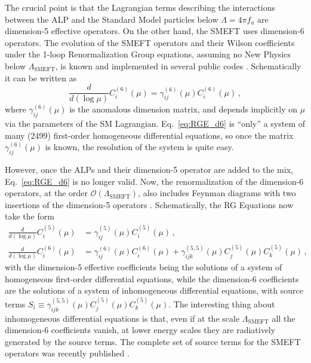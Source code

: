 \documentclass[combined.tex]{subfiles}
\begin{document}
The crucial point is that the Lagrangian terms describing the interactions between the ALP and the Standard Model particles below $\Lambda = 4\pi f_a$ are dimension-5 effective operators. On the other hand, the SMEFT uses dimension-6 operators. The evolution of the SMEFT operators and their Wilson coefficients under the 1-loop Renormalization Group equations, assuming no New Physics below $\Lambda_\mathrm{SMEFT}$, is known \cite{Jenkins:2013zja,Jenkins:2013wua,Alonso:2013hga,} and implemented in several public codes \cite{Celis:2017hod,Aebischer:2018bkb}. Schematically it can be written as
\begin{equation}
\frac{d}{d(\log \mu)}C^{(6)}_i(\mu) = \gamma^{(6)}_{ij}(\mu)C^{(6)}_i(\mu)\,,\label{eq:RGE_d6}
\end{equation}
where $\gamma^{(6)}_{ij}(\mu)$ is the anomalous dimension matrix, and depends implicitly on $\mu$ via the parameters of the SM Lagrangian. Eq.~\eqref{eq:RGE_d6} is ``only'' a system of many (2499) first-order homogeneous differential equations, so once the matrix $\gamma^{(6)}_{ij}(\mu)$ is known, the resolution of the system is quite easy.

However, once the ALPs and their dimension-5 operator are added to the mix, Eq.~\eqref{eq:RGE_d6} is no longer valid.  Now, the renormalization of the dimension-6 operators, at the order $\mathcal{O}(\Lambda_\mathrm{SMEFT})$, also includes Feynman diagrams with two insertions of the dimension-5 operators \cite{Manohar:2018aog}. Schematically, the RG Equations now take the form
\begin{align}
\frac{d}{d(\log \mu)}C^{(5)}_i(\mu) &= \gamma^{(5)}_{ij}(\mu)C^{(5)}_i(\mu)\,, \nonumber\\
\frac{d}{d(\log \mu)}C^{(6)}_i(\mu) &= \gamma^{(6)}_{ij}(\mu)C^{(6)}_i(\mu) + \gamma_{ijk}^{(5,5)}(\mu) C_j^{(5)}(\mu) C_k^{(5)}(\mu) \,,
\end{align}
with the dimension-5 effective coefficients being the solutions of a system of homogeneous first-order differential equations, while the dimension-6 coefficients are the solutions of a system of inhomogeneous differential equations, with source terms $S_i \equiv \gamma_{ijk}^{(5,5)}(\mu) C_j^{(5)}(\mu) C_k^{(5)}(\mu)$. The interesting thing about inhomogeneous differential equations is that, even if at the scale $\Lambda_\mathrm{SMEFT}$ all the dimension-6 coefficients vanish, at lower energy scales they are radiatively generated by the source terms. The complete set of source terms for the SMEFT operators was recently published \cite{Galda:2021hbr}.
\end{document}

